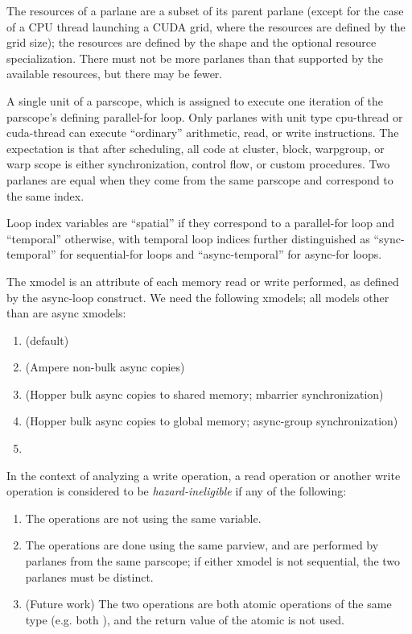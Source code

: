 The resources of a parlane are a subset of its parent parlane (except for the case of a CPU thread launching a CUDA grid, where the resources are defined by the grid size); the resources are defined by the shape and the optional resource specialization.
There must not be more parlanes than that supported by the available resources, but there may be fewer.

\filbreak
{} A single unit of a parscope, which is assigned to execute one iteration of the parscope's defining parallel-for loop.
Only parlanes with unit type cpu-thread or cuda-thread can execute ``ordinary'' arithmetic, read, or write instructions. 
The expectation is that after scheduling, all code at cluster, block, warpgroup, or warp scope is either synchronization, control flow, or custom procedures.
Two parlanes are equal when they come from the same parscope and correspond to the same index.

\filbreak
{} Loop index variables are ``spatial'' if they correspond to a parallel-for loop and ``temporal'' otherwise, with temporal loop indices further distinguished as ``sync-temporal'' for sequential-for loops and ``async-temporal'' for async-for loops.

\filbreak
{}
The xmodel is an attribute of each memory read or write performed, as defined by the async-loop construct.
We need the following xmodels; all models other than  are async xmodels:
\begin{enumerate}
  \item {} (default)
  \item {} (Ampere non-bulk async copies)
  \item {} (Hopper bulk async copies to shared memory; mbarrier synchronization)
  \item {} (Hopper bulk async copies to global memory; async-group synchronization)
  \item {}
\end{enumerate}

\filbreak
{} In the context of analyzing a write operation, a read operation or another write operation is considered to be \textit{hazard-ineligible} if any of the following:

\begin{enumerate}
  \item The operations are not using the same variable.
  \item The operations are done using the same parview, and are performed by parlanes from the same parscope; if either xmodel is not sequential, the two parlanes must be distinct.
  \item (Future work) The two operations are both atomic operations of the same type (e.g. both ), and the return value of the atomic is not used.
\end{enumerate}

